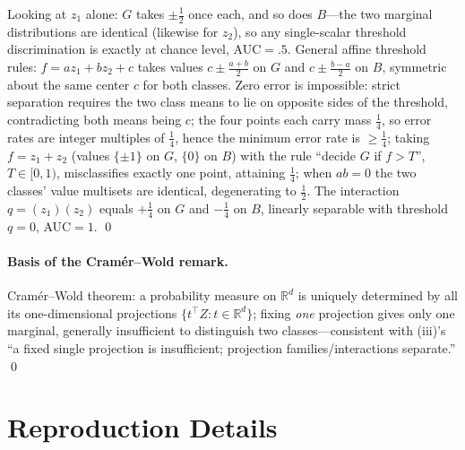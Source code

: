 \documentclass[11pt]{article}
\newcommand{\R}{\mathbb R}
\numberwithin{equation}{section}
\begin{document}
Looking at $z_1$ alone: $G$ takes $\pm\tfrac12$ once each, and so does $B$---the two marginal distributions are identical (likewise for $z_2$), so any single-scalar threshold discrimination is exactly at chance level, AUC$=.5$. General affine threshold rules: $f=az_1+bz_2+c$ takes values $c\pm\tfrac{a+b}{2}$ on $G$ and $c\pm\tfrac{b-a}{2}$ on $B$, symmetric about the same center $c$ for both classes. Zero error is impossible: strict separation requires the two class means to lie on opposite sides of the threshold, contradicting both means being $c$; the four points each carry mass $\tfrac14$, so error rates are integer multiples of $\tfrac14$, hence the minimum error rate is $\ge\tfrac14$; taking $f=z_1+z_2$ (values $\{\pm1\}$ on $G$, $\{0\}$ on $B$) with the rule ``decide $G$ if $f>T$'', $T\in[0,1)$, misclassifies exactly one point, attaining $\tfrac14$; when $ab=0$ the two classes' value multisets are identical, degenerating to $\tfrac12$. The interaction $q=(z_1)(z_2)$ equals $+\tfrac14$ on $G$ and $-\tfrac14$ on $B$, linearly separable with threshold $q=0$, AUC$=1$. \qed

\paragraph{Basis of the Cram\'er--Wold remark.}
Cram\'er--Wold theorem: a probability measure on $\R^d$ is uniquely determined by all its one-dimensional projections $\{t^\top Z:t\in\R^d\}$; fixing \emph{one} projection gives only one marginal, generally insufficient to distinguish two classes---consistent with (iii)'s ``a fixed single projection is insufficient; projection families/interactions separate.'' \qed

\FloatBarrier
\section{Reproduction Details}\label{app:repro}
\end{document}
